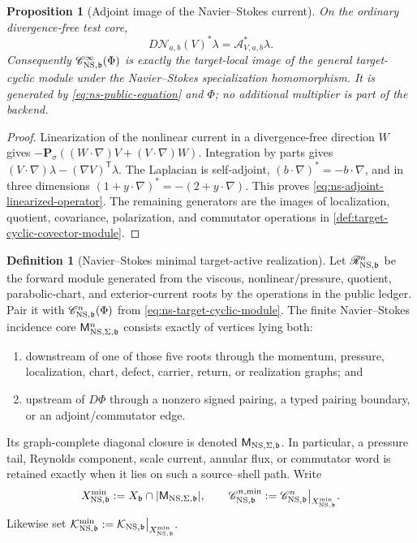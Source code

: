\documentclass[11pt]{article}
\numberwithin{section}{part}
\theoremstyle{plain}
\newtheorem{proposition}[proposition]{Proposition}
\theoremstyle{definition}
\newtheorem{definition}[definition]{Definition}
\theoremstyle{remark}
\begin{document}
\begin{proposition}[Adjoint image of the Navier--Stokes current]
\label{prop:ns-adjoint-current-image}
On the ordinary divergence-free test core,
\[
 D\mathcal N_{a,b}(V)^*\lambda
 =\mathcal A^*_{V,a,b}\lambda.
\]
Consequently \(\mathscr C^\infty_{{\rm NS},\mathfrak b}(\Phi)\) is exactly the target-local image of
the general target-cyclic module under the Navier--Stokes specialization
homomorphism.  It is generated by \eqref{eq:ns-public-equation} and \(\Phi\);
no additional multiplier is part of the backend.
\end{proposition}

\begin{proof}
Linearization of the nonlinear current in a divergence-free direction \(W\)
gives
\(-\mathbf P_\sigma((W\cdot\nabla)V+(V\cdot\nabla)W)\).
Integration by parts gives
\((V\cdot\nabla)\lambda-(\nabla V)^{\mathsf T}\lambda\).
The Laplacian is self-adjoint, \((b\cdot\nabla)^*=-b\cdot\nabla\), and in
three dimensions
\((1+y\cdot\nabla)^*=-(2+y\cdot\nabla)\).  This proves
\eqref{eq:ns-adjoint-linearized-operator}.  The remaining generators are the
images of localization, quotient, covariance, polarization, and commutator
operations in \cref{def:target-cyclic-covector-module}.
\end{proof}

\begin{definition}[Navier--Stokes minimal target-active realization]
\label{def:ns-minimal-target-realization}
Let \(\mathscr R^n_{{\rm NS},\mathfrak b}\) be the forward module generated
from the viscous, nonlinear/pressure, quotient, parabolic-chart, and
exterior-current roots by the operations in the public ledger.  Pair it with
\(\mathscr C^n_{{\rm NS},\mathfrak b}(\Phi)\) from
\eqref{eq:ns-target-cyclic-module}.  The finite Navier--Stokes incidence core
\(\mathsf M^n_{{\rm NS},\Sigma,\mathfrak b}\) consists exactly of vertices
lying both:
\begin{enumerate}[label=\textup{(R\arabic*)}]
\item downstream of one of those five roots through the momentum, pressure,
localization, chart, defect, carrier, return, or realization graphs; and
\item upstream of \(D\Phi\) through a nonzero signed pairing, a typed pairing
boundary, or an adjoint/commutator edge.
\end{enumerate}
Its graph-complete diagonal closure is denoted
\(\mathsf M_{{\rm NS},\Sigma,\mathfrak b}\).  In particular, a pressure tail,
Reynolds component, scale current, annular flux, or commutator word is retained
exactly when it lies on such a source--shell path.
Write
\begin{equation}
 \label{eq:ns-minimal-target-state-space}
 X^{\min}_{{\rm NS},\mathfrak b}
 :=X_{\mathfrak b}\cap
   \lvert\mathsf M_{{\rm NS},\Sigma,\mathfrak b}\rvert,
 \qquad
 \mathscr C^{n,\min}_{{\rm NS},\mathfrak b}
 :=\mathscr C^n_{{\rm NS},\mathfrak b}\big|_{X^{\min}_{{\rm NS},\mathfrak b}}.
\end{equation}
Likewise set
\(
 \mathcal K^{\min}_{{\rm NS},\mathfrak b}
 :=\mathcal K_{{\rm NS},\mathfrak b}
   \big|_{X^{\min}_{{\rm NS},\mathfrak b}}.
\)
\end{definition}
\end{document}

